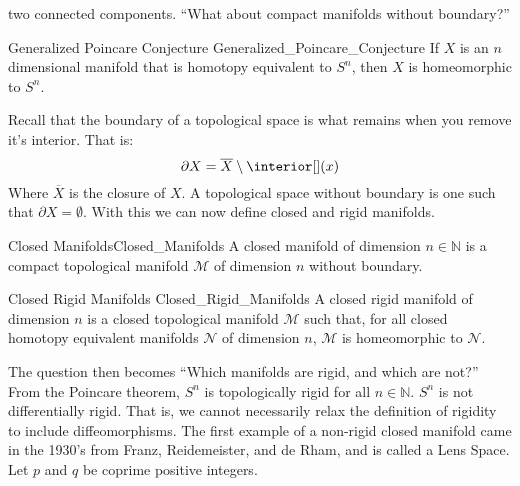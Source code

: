             two connected components. ``What about compact manifolds without
            boundary?''
            \begin{ltheorem}{Generalized Poincare Conjecture}
                            {Generalized_Poincare_Conjecture}
                If $X$ is an $n$ dimensional manifold that
                is homotopy equivalent to $S^{n}$, then $X$
                is homeomorphic to $S^{n}$.
            \end{ltheorem}
            \vspace{5pt}
            Recall that the boundary of a topological space
            is what remains when you remove it's interior.
            That is:
            \begin{equation}
                \partial{X}=\overline{X}\setminus\interior[](x)
            \end{equation}
            Where $\overline{X}$ is the closure of $X$.
            A topological space without boundary is one such that
            $\partial{X}=\emptyset$. With this we can now define
            closed and rigid manifolds.
            \begin{ldefinition}{Closed Manifolds}{Closed_Manifolds}
                A closed manifold of dimension $n\in\mathbb{N}$ is
                a compact topological manifold $\mathcal{M}$ of
                dimension $n$ without boundary.
            \end{ldefinition}
            \begin{ldefinition}{Closed Rigid Manifolds}
                               {Closed_Rigid_Manifolds}
                A closed rigid manifold of dimension $n$
                is a closed topological manifold $\mathcal{M}$
                such that, for all closed homotopy equivalent
                manifolds $\mathcal{N}$ of dimension $n$,
                $\mathcal{M}$ is homeomorphic to $\mathcal{N}$.
            \end{ldefinition}
            The question then becomes
            ``Which manifolds are rigid, and which are not?''
            From the Poincare theorem, $S^{n}$ is topologically
            rigid for all $n\in\mathbb{N}$. $S^{n}$ is not differentially
            rigid. That is, we cannot necessarily relax the definition
            of rigidity to include diffeomorphisms.
            The first example of a non-rigid closed
            manifold came in the 1930's from Franz, Reidemeister,
            and de Rham, and is called a Lens Space.
            Let $p$ and $q$ be coprime positive integers.
